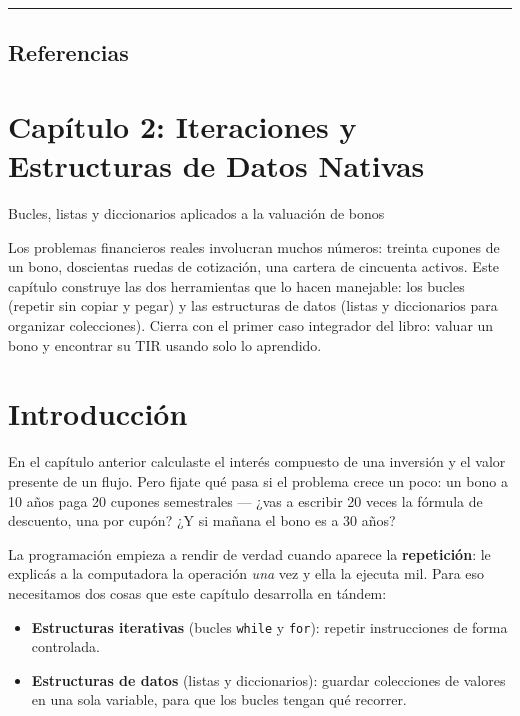 \documentclass[
  spanish,
  letterpaper,
  DIV=11,
  numbers=noendperiod]{scrreprt}
\providecommand{\tightlist}{%
  \setlength{\itemsep}{0pt}\setlength{\parskip}{0pt}}
\begin{document}
\begin{center}\rule{0.5\linewidth}{0.5pt}\end{center}

\section{Referencias}\label{referencias}

\label{refs}

\chapter{Capítulo 2: Iteraciones y Estructuras de Datos
Nativas}\label{capuxedtulo-2-iteraciones-y-estructuras-de-datos-nativas}

Bucles, listas y diccionarios aplicados a la valuación de bonos

Los problemas financieros reales involucran muchos números: treinta
cupones de un bono, doscientas ruedas de cotización, una cartera de
cincuenta activos. Este capítulo construye las dos herramientas que lo
hacen manejable: los bucles (repetir sin copiar y pegar) y las
estructuras de datos (listas y diccionarios para organizar colecciones).
Cierra con el primer caso integrador del libro: valuar un bono y
encontrar su TIR usando solo lo aprendido.

\hfill\break

\chapter*{Introducción}\label{introducciuxf3n-1}


En el capítulo anterior calculaste el interés compuesto de una inversión
y el valor presente de un flujo. Pero fijate qué pasa si el problema
crece un poco: un bono a 10 años paga 20 cupones semestrales --- ¿vas a
escribir 20 veces la fórmula de descuento, una por cupón? ¿Y si mañana
el bono es a 30 años?

La programación empieza a rendir de verdad cuando aparece la
\textbf{repetición}: le explicás a la computadora la operación
\emph{una} vez y ella la ejecuta mil. Para eso necesitamos dos cosas que
este capítulo desarrolla en tándem:

\begin{itemize}
\tightlist
\item
  \textbf{Estructuras iterativas} (bucles \texttt{while} y
  \texttt{for}): repetir instrucciones de forma controlada.
\item
  \textbf{Estructuras de datos} (listas y diccionarios): guardar
  colecciones de valores en una sola variable, para que los bucles
  tengan qué recorrer.
\end{itemize}
\end{document}
